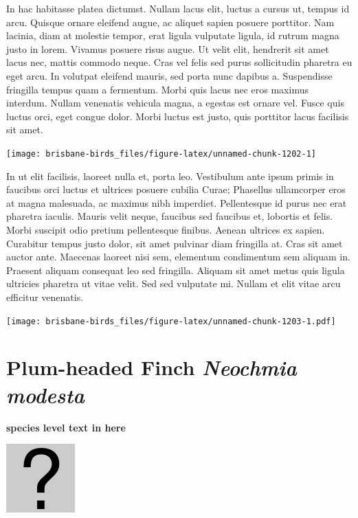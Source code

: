 \documentclass[]{book}
\let\origfigure\figure
\let\endorigfigure\endfigure
\renewenvironment{figure}[1][2] {
  \expandafter\origfigure\expandafter[H]
} {
  \endorigfigure
}
\begin{document}
In hac habitasse platea dictumst. Nullam lacus elit, luctus a cursus ut,
tempus id arcu. Quisque ornare eleifend augue, ac aliquet sapien posuere
porttitor. Nam lacinia, diam at molestie tempor, erat ligula vulputate
ligula, id rutrum magna justo in lorem. Vivamus posuere risus augue. Ut
velit elit, hendrerit sit amet lacus nec, mattis commodo neque. Cras vel
felis sed purus sollicitudin pharetra eu eget arcu. In volutpat eleifend
mauris, sed porta nunc dapibus a. Suspendisse fringilla tempus quam a
fermentum. Morbi quis lacus nec eros maximus interdum. Nullam venenatis
vehicula magna, a egestas est ornare vel. Fusce quis luctus orci, eget
congue dolor. Morbi luctus est justo, quis porttitor lacus facilisis sit
amet.

\begin{figure}
\texttt{[image: brisbane-birds\_files/figure-latex/unnamed-chunk-1202-1]} \caption{insert figure caption}\label{fig:unnamed-chunk-1202}
\end{figure}

In ut elit facilisis, laoreet nulla et, porta leo. Vestibulum ante ipsum
primis in faucibus orci luctus et ultrices posuere cubilia Curae;
Phasellus ullamcorper eros at magna malesuada, ac maximus nibh
imperdiet. Pellentesque id purus nec erat pharetra iaculis. Mauris velit
neque, faucibus sed faucibus et, lobortis et felis. Morbi suscipit odio
pretium pellentesque finibus. Aenean ultrices ex sapien. Curabitur
tempus justo dolor, sit amet pulvinar diam fringilla at. Cras sit amet
auctor ante. Maecenas laoreet nisi sem, elementum condimentum sem
aliquam in. Praesent aliquam consequat leo sed fringilla. Aliquam sit
amet metus quis ligula ultricies pharetra ut vitae velit. Sed sed
vulputate mi. Nullam et elit vitae arcu efficitur venenatis.

\begin{figure}
\centering
\texttt{[image: brisbane-birds\_files/figure-latex/unnamed-chunk-1203-1.pdf]}
\caption{\label{fig:unnamed-chunk-1203}insert figure caption}
\end{figure}

\section{\texorpdfstring{Plum-headed Finch \emph{Neochmia
modesta}}{Plum-headed Finch Neochmia modesta}}\label{plum-headed-finch-neochmia-modesta}

\textbf{species level text in here}

\begin{figure}
\centering
\includegraphics{assets/missing.png}
\caption{No image for species}
\end{figure}
\end{document}
